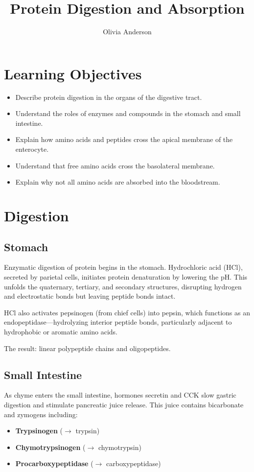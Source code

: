 \documentclass{tufte-handout}
\title{Protein Digestion and Absorption}
\author{Olivia Anderson}
\begin{document}
\maketitle

\section*{Learning Objectives}
\begin{itemize}
  \item Describe protein digestion in the organs of the digestive tract.
  \item Understand the roles of enzymes and compounds in the stomach and small intestine.
  \item Explain how amino acids and peptides cross the apical membrane of the enterocyte.
  \item Understand that free amino acids cross the basolateral membrane.
  \item Explain why not all amino acids are absorbed into the bloodstream.
\end{itemize}

\section{Digestion}

\subsection{Stomach}
Enzymatic digestion of protein begins in the stomach. Hydrochloric acid (HCl), secreted by parietal cells, initiates protein denaturation by lowering the pH. This unfolds the quaternary, tertiary, and secondary structures, disrupting hydrogen and electrostatic bonds but leaving peptide bonds intact.

HCl also activates pepsinogen (from chief cells) into pepsin, which functions as an endopeptidase—hydrolyzing interior peptide bonds, particularly adjacent to hydrophobic or aromatic amino acids.

The result: linear polypeptide chains and oligopeptides.

\subsection{Small Intestine}
As chyme enters the small intestine, hormones secretin and CCK slow gastric digestion and stimulate pancreatic juice release. This juice contains bicarbonate and zymogens including:
\begin{itemize}
  \item \textbf{Trypsinogen} ($\rightarrow$ trypsin)
  \item \textbf{Chymotrypsinogen} ($\rightarrow$ chymotrypsin)
  \item \textbf{Procarboxypeptidase} ($\rightarrow$ carboxypeptidase)
\end{itemize}
\end{document}

